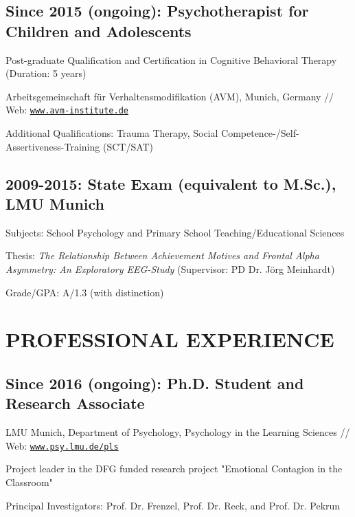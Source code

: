 \documentclass[letterpaper]{article}
\renewenvironment{itemize}{ %
  \begin{list}{}{ %
    \setlength{\leftmargin}{2.5em} %
  }
}{
  \end{list}
}
\begin{document}
  \subsection*{Since 2015 (ongoing): Psychotherapist for Children and Adolescents}
  \begin{itemize}
    \item Post-graduate Qualification and Certification in Cognitive Behavioral Therapy (Duration: 5 years)
      \item Arbeitsgemeinschaft für Verhaltensmodifikation (AVM), Munich, Germany // Web: \href{https://https://www.avm-institute.de}{\tt www.avm-institute.de}
      \item Additional Qualifications: Trauma Therapy, Social Competence-/Self-Assertiveness-Training (SCT/SAT)
  \end{itemize}
  
  
\subsection*{2009-2015: State Exam (equivalent to M.Sc.), LMU Munich}
\begin{itemize}
  \item Subjects: School Psychology and Primary School Teaching/Educational Sciences
  \item Thesis: {\it The Relationship Between Achievement Motives and Frontal Alpha Asymmetry: An Exploratory EEG-Study} (Supervisor: PD Dr. Jörg Meinhardt)
  \item Grade/GPA: A/1.3 (with distinction) 
\end{itemize}


\section*{PROFESSIONAL EXPERIENCE}
\subsection*{Since 2016 (ongoing): Ph.D. Student and Research Associate}
\begin{itemize}
  \item LMU Munich, Department of Psychology, Psychology in the Learning Sciences // Web: \href{https://www.psy.lmu.de/pls/}{\tt www.psy.lmu.de/pls}
    \item Project leader in the DFG funded research project "Emotional Contagion in the Classroom"
    \item Principal Investigators: Prof. Dr. Frenzel, Prof. Dr. Reck, and Prof. Dr. Pekrun
    
  \end{itemize}
\end{document}
